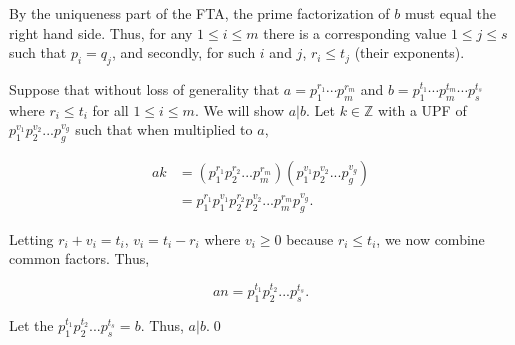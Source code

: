 \documentclass[12pt]{article}
\begin{document}
\noindent By the uniqueness part of the FTA, the prime factorization of $b$ must equal the right hand side. Thus, for any $1\leq i\leq m$ there is a corresponding value $1\leq j \leq s$ such that $p_i=q_j$, and secondly, for such $i$ and $j$, $r_{i}\leq t_{j}$ (their exponents).

\bigskip

\noindent Suppose that without loss of generality that $a=p_1^{r_1}\cdots p_m^{r_m}$ and $b=p_1^{t_1} \cdots p_m^{t_m}\cdots p_s^{t_s}$ where $r_i\leq t_i$ for all $1\leq i\leq m$. We will show $a|b$. Let $k\in\mathbb{Z}$ with a UPF of $p_{1}^{v_{1}}p_{2}^{v_{2}}...p_{g}^{v_{g}}$ such that when multiplied to $a$,

\begin{align*}
ak &= (p_{1}^{r_{1}}p_{2}^{r_{2}}...p_{m}^{r_{m}}) (p_{1}^{v_{1}}p_{2}^{v_{2}}...p_{g}^{v_{g}}) \\
 &= p_{1}^{r_{1}}p_{1}^{v_{1}}p_{2}^{r_{2}}p_{2}^{v_{2}}...p_{m}^{r_{m}}p_{g}^{v_{g}}.
\end{align*}

\noindent Letting $r_{i}+v_{i}=t_{i}$, $v_{i}=t_{i}-r_{i}$ where $v_{i}\geq 0$ because $r_{i}\leq t_{i}$, we now combine common factors. Thus,

\begin{equation*}
an = p_{1}^{t_{1}}p_{2}^{t_{2}}...p_{s}^{t_{s}}.
\end{equation*}

\noindent Let the $p_{1}^{t_{1}}p_{2}^{t_{2}}...p_{s}^{t_{s}}=b$. Thus, $a|b$.\qed
\end{document}
